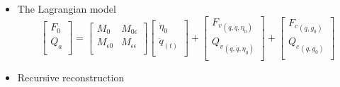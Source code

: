 \documentclass[compress]{thesisbeamer}
\begin{document}
\begin{frame}
\begin{itemize}
\begin{itemize}
  					\item The Lagrangian model
  					\begin{equation}
  						\begin{bmatrix}
  						{F}_{0} \\
  						{Q}_{a}	\\
					\end{bmatrix} 
					= 
					\begin{bmatrix}
						{M}_{0}		& {M}_{0\epsilon} 				\\ 
						{M}_{\epsilon0}	& {M}_{\epsilon\epsilon}	\\
					\end{bmatrix}
					\begin{bmatrix}
						{\dot{\eta}}_{0} 	\\ 
						{\ddot{q}}_{(t)}	\\
					\end{bmatrix}	
					+
					\begin{bmatrix}
						{{F}_{v}}_{\left(q , \dot{q} , {\eta}_{0} \right)}	\\
						{{Q}_{v}}_{\left(q , \dot{q} , {\eta}_{0} \right)}	\\
					\end{bmatrix}
					+
					\begin{bmatrix}
						{{F}_{c}}_{\left(q , {g}_{0} \right)}	\\ 
						{{Q}_{c}}_{\left(q , {g}_{0} \right)}	\\
					\end{bmatrix}
  					\end{equation}
  					\item Recursive reconstruction
  				\end{itemize}
 			\end{itemize}
		\end{frame}
		
\end{document}
